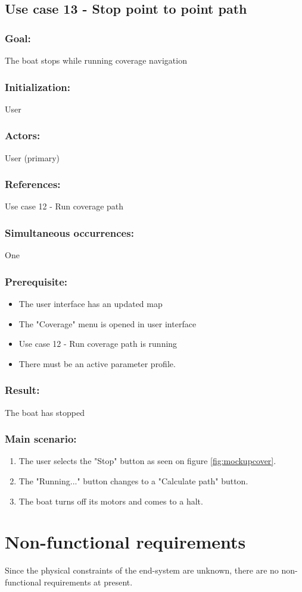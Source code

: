 \begin{framed}
	\subsection{Use case 13 - Stop point to point path}
	\subsubsection*{Goal:}
	The boat stops while running coverage navigation
	
	\subsubsection*{Initialization:}
	User
	
	\subsubsection*{Actors:}
	User (primary)
	
	\subsubsection*{References:}
	Use case 12 - Run coverage path
	
	\subsubsection*{Simultaneous occurrences:}
	One 
	
	\subsubsection*{Prerequisite:}
	\begin{itemize}
		\item The user interface has an updated map
		\item The "Coverage" menu is opened in user interface
		\item Use case 12 - Run coverage path is running
		\item There must be an active parameter profile.
		
	\end{itemize}
	
	\subsubsection*{Result:}
	The boat has stopped
	
	\subsubsection*{Main scenario:}
	\begin{enumerate}
		\item The user selects the "Stop" button as seen on figure \ref{fig:mockupcover}.
		\item The "Running..." button changes to a "Calculate path" button.
		\item The boat turns off its motors and comes to a halt.
	\end{enumerate}	
\end{framed}	

\section{Non-functional requirements}
Since the physical constraints of the end-system are unknown, there are no non-functional requirements at present.

